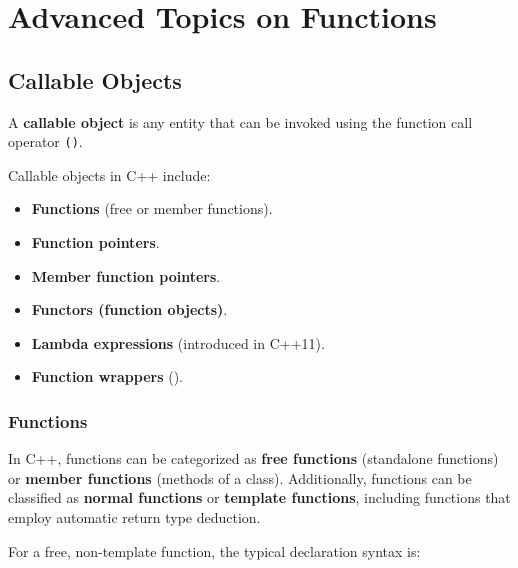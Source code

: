
\chapter{Advanced Topics on Functions}

\vspace{-1em}

\section{Callable Objects}

\vspace{-0.5em}

A \textbf{callable object} is any entity that can be invoked using the function call operator \texttt{()}.

Callable objects in C++ include:

\vspace{-0.7em}

\begin{multicols}{2}
\begin{itemize}
    \item \textbf{Functions} (free or member functions).
    \item \textbf{Function pointers}.
    \item \textbf{Member function pointers}.
    \item \textbf{Functors (function objects)}.
    \item \textbf{Lambda expressions} (introduced in C++11).
    \item \textbf{Function wrappers} ().
\end{itemize}
\end{multicols}

\vspace{-1.5em}

\subsection{Functions}

In C++, functions can be categorized as \textbf{free functions} (standalone functions) or \textbf{member functions} (methods of a class). Additionally, functions can be classified as \textbf{normal functions} or \textbf{template functions}, including functions that employ automatic return type deduction.

For a free, non-template function, the typical declaration syntax is:

